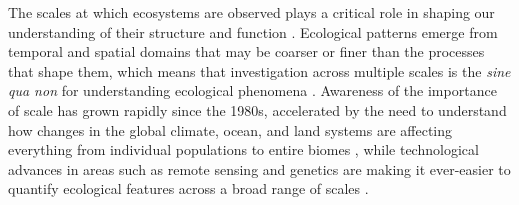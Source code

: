 \documentclass[12pt]{article}
\begin{document}


\linenumbers
The scales at which ecosystems are observed plays a critical role in shaping our understanding of their structure and function \cite{levin_problem_1992,chave_problem_2013,wiens_spatial_1989}.  Ecological patterns emerge from temporal and spatial domains that may be coarser or finer than the processes that shape them, which means that investigation across multiple scales is the \emph{sine qua non} for understanding ecological phenomena \cite{levin_problem_1992}. Awareness of the importance of scale has grown rapidly since the 1980s, accelerated by the need to understand how changes in the global climate, ocean, and land systems are affecting everything from individual populations \cite{tingley_push_2012} to entire biomes \cite{xiao_photosynthetic_2004}, while technological advances in areas such as remote sensing and genetics are making it ever-easier to quantify ecological features across a broad range of scales \cite{schneider_rise_2001,chave_problem_2013}.  
\end{document}
